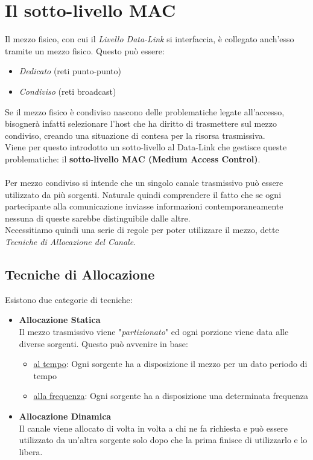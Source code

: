 \documentclass{article}
\begin{document}
    \section{Il sotto-livello MAC}
        Il mezzo fisico, con cui il \textit{Livello Data-Link} si interfaccia, è collegato anch'esso tramite un mezzo fisico. Questo può essere:
        \begin{itemize}
            \item \textit{Dedicato} (reti punto-punto)
            \item \textit{Condiviso} (reti broadcast)
        \end{itemize}
        Se il mezzo fisico è condiviso nascono delle problematiche legate all'accesso, bisognerà infatti selezionare l'host che ha diritto di trasmettere sul mezzo condiviso, creando una situazione di contesa per la risorsa trasmissiva. \\
        Viene per questo introdotto un sotto-livello al Data-Link che gestisce queste problematiche: il \textbf{sotto-livello MAC (Medium Access Control)}. \\
        \\
        Per mezzo condiviso si intende che un singolo canale trasmissivo può essere utilizzato da più sorgenti. Naturale quindi comprendere il fatto che se ogni partecipante alla comunicazione inviasse informazioni contemporaneamente nessuna di queste sarebbe distinguibile dalle altre. \\
        Necessitiamo quindi una serie di regole per poter utilizzare il mezzo, dette \textit{Tecniche di Allocazione del Canale}.

        \subsection{Tecniche di Allocazione}
            Esistono due categorie di tecniche:
            \begin{itemize}
                \item \textbf{Allocazione Statica} \\
                      Il mezzo trasmissivo viene "\textit{partizionato}" ed ogni porzione viene data alle diverse sorgenti. Questo può avvenire in base:
                      \begin{itemize}
                          \item \underline{al tempo}: Ogni sorgente ha a disposizione il mezzo per un dato periodo di tempo
                          \item \underline{alla frequenza}: Ogni sorgente ha a disposizione una determinata frequenza
                      \end{itemize}
                \item \textbf{Allocazione Dinamica} \\
                      Il canale viene allocato di volta in volta a chi ne fa richiesta e può essere utilizzato da un'altra sorgente solo dopo che la prima finisce di utilizzarlo e lo libera.                     
            \end{itemize}
\end{document}
